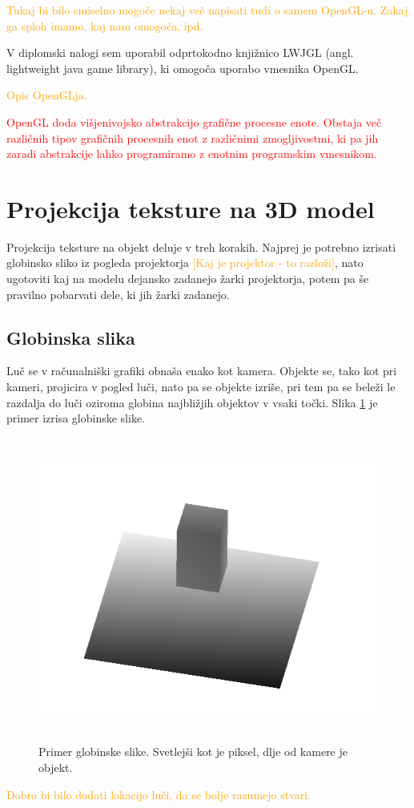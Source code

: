 \documentclass[a4paper, 12pt]{book}
\begin{document}
\textcolor{orange}{Tukaj bi bilo smiselno mogoče nekaj več napisati tudi o samem OpenGL-u. Zakaj ga sploh imamo, kaj nam omogoča, ipd.}

V diplomski nalogi sem uporabil odprtokodno knjižnico LWJGL (angl. lightweight java game library), ki omogoča uporabo vmesnika OpenGL.

\textcolor{orange}{Opis OpenGLja.}

\textcolor{red}{OpenGL doda višjenivojsko abstrakcijo grafične procesne enote. Obstaja več različnih tipov grafičnih procesnih enot z različnimi zmogljivostmi, ki pa jih zaradi abstrakcije lahko programiramo z enotnim programskim vmesnikom. }
\textcolor{red}{}
\section{Projekcija teksture na 3D model}

Projekcija teksture na objekt deluje v treh korakih. Najprej je potrebno izrisati globinsko sliko iz pogleda projektorja \textcolor{orange}{[Kaj je projektor - to razloži]}, nato ugotoviti kaj na modelu dejansko zadanejo žarki projektorja, potem pa še pravilno pobarvati dele, ki jih žarki zadanejo.
\subsection*{Globinska slika}
Luč se v računalniški grafiki obnaša enako kot kamera. Objekte se, tako kot pri kameri, projicira v pogled luči, nato pa se objekte izriše, pri tem pa se beleži le razdalja do luči oziroma globina najbližjih objektov v vsaki točki. Slika \ref{globinskaslika} je primer izrisa globinske slike.

\begin{figure}[h]
\begin{center}
\includegraphics[width=12cm, height=10cm, keepaspectratio=true]{Globinska_slika.png}
\end{center}
\caption{Primer globinske slike. Svetlejši kot je piksel, dlje od kamere je objekt.}
\label{globinskaslika}
\end{figure}
\textcolor{orange}{Dobro bi bilo dodati lokacijo luči, da se bolje razumejo stvari.}
\end{document}
